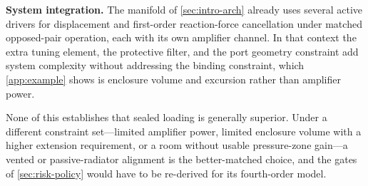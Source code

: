 \textbf{System integration.} The manifold of \cref{sec:intro-arch} already
uses several active drivers for displacement and first-order
reaction-force cancellation under matched opposed-pair operation, each
with its own amplifier channel. In that context the extra tuning element,
the protective filter, and the port geometry constraint add system
complexity without addressing the binding constraint, which
\cref{app:example} shows is enclosure volume and excursion rather than
amplifier power.

None of this establishes that sealed loading is generally superior. Under a
different constraint set---limited amplifier power, limited enclosure
volume with a higher extension requirement, or a room without usable
pressure-zone gain---a vented or passive-radiator alignment is the
better-matched choice, and the gates of \cref{sec:risk-policy} would have
to be re-derived for its fourth-order model.
